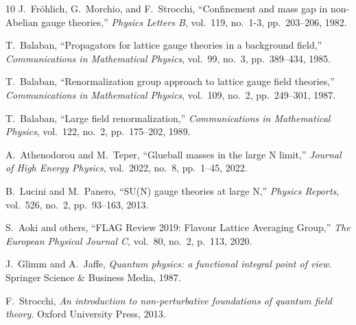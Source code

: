 \documentclass[11pt]{article}
\numberwithin{equation}{section}
\theoremstyle{definition}
\theoremstyle{remark}
\begin{document}
\begin{thebibliography}{10}
J.~Fröhlich, G.~Morchio, and F.~Strocchi,
\newblock ``Confinement and mass gap in non-{Abelian} gauge theories,''
\newblock \emph{Physics Letters B}, vol.~119, no.~1-3, pp.~203--206, 1982.

T.~Balaban,
\newblock ``Propagators for lattice gauge theories in a background field,''
\newblock \emph{Communications in Mathematical Physics}, vol.~99, no.~3, pp.~389--434, 1985.

T.~Balaban,
\newblock ``Renormalization group approach to lattice gauge field theories,''
\newblock \emph{Communications in Mathematical Physics}, vol.~109, no.~2, pp.~249--301, 1987.

T.~Balaban,
\newblock ``Large field renormalization,''
\newblock \emph{Communications in Mathematical Physics}, vol.~122, no.~2, pp.~175--202, 1989.

A.~Athenodorou and M.~Teper,
\newblock ``Glueball masses in the large {N} limit,''
\newblock \emph{Journal of High Energy Physics}, vol.~2022, no.~8, pp.~1--45, 2022.

B.~Lucini and M.~Panero,
\newblock ``{SU(N)} gauge theories at large {N},''
\newblock \emph{Physics Reports}, vol.~526, no.~2, pp.~93--163, 2013.

S.~Aoki and others,
\newblock ``{FLAG} Review 2019: {Flavour} Lattice Averaging Group,''
\newblock \emph{The European Physical Journal C}, vol.~80, no.~2, p.~113, 2020.

J.~Glimm and A.~Jaffe,
\newblock \emph{Quantum physics: a functional integral point of view}.
\newblock Springer Science \& Business Media, 1987.

F.~Strocchi,
\newblock \emph{An introduction to non-perturbative foundations of quantum field theory}.
\newblock Oxford University Press, 2013.

\end{thebibliography}
\end{document}
